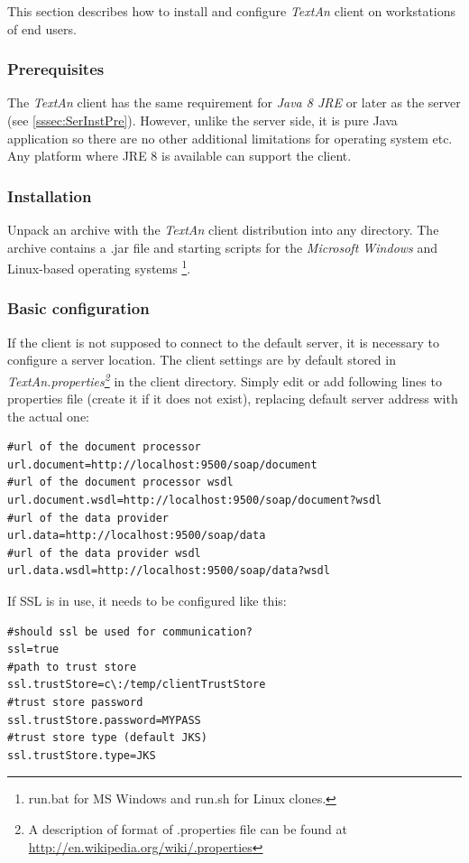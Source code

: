 \documentclass[12pt,a4paper]{report}
\newcommand{\textan}{\emph{TextAn}}
\begin{document}
This section describes how to install and configure \textan{} client on workstations of end users.

\subsubsection{Prerequisites}

The \textan{} client has the same requirement for \emph{Java 8 JRE} or later as the server (see \ref{sssec:SerInstPre}).
However, unlike the server side, it is pure Java application so there are no other additional limitations for operating system etc.
Any platform where JRE 8 is available can support the client.

\subsubsection{Installation}

Unpack an archive with the \textan{} client distribution into any directory. 
The archive contains a .jar file and starting scripts for the \emph{Microsoft Windows} and Linux-based operating systems
\footnote{run.bat for MS Windows and run.sh for Linux clones.\label{runscript_note}}.

\subsubsection{Basic configuration}

If the client is not supposed to connect to the default server, it is necessary to configure a server location. 
The client settings are by default stored in \emph{TextAn.properties\footnote{A description of format of .properties file can be found at \url{http://en.wikipedia.org/wiki/.properties}}}
in the client directory. 
Simply edit or add following lines to properties file (create it if it does not exist),
replacing default server address with the actual one:
\begin{lstlisting}[frame=single,language=properties]
#url of the document processor
url.document=http://localhost:9500/soap/document
#url of the document processor wsdl
url.document.wsdl=http://localhost:9500/soap/document?wsdl
#url of the data provider
url.data=http://localhost:9500/soap/data
#url of the data provider wsdl
url.data.wsdl=http://localhost:9500/soap/data?wsdl
\end{lstlisting}

If SSL is in use, it needs to be configured like this:
\begin{lstlisting}[frame=single,language=properties]
#should ssl be used for communication?
ssl=true
#path to trust store
ssl.trustStore=c\:/temp/clientTrustStore
#trust store password
ssl.trustStore.password=MYPASS
#trust store type (default JKS)
ssl.trustStore.type=JKS
\end{lstlisting}
\end{document}
